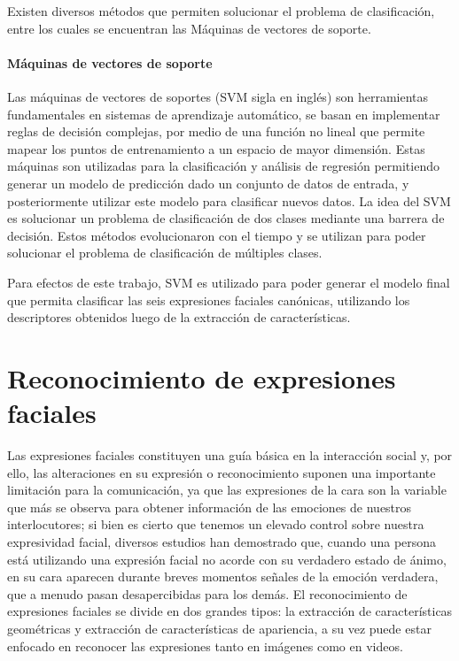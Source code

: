 Existen diversos métodos que permiten solucionar el problema de clasificación, entre los cuales se encuentran las Máquinas de vectores de soporte.

	\paragraph{Máquinas de vectores de soporte}
	\label{sec:svm}
	Las máquinas de vectores de soportes (SVM sigla en inglés) son herramientas fundamentales en sistemas de aprendizaje automático, se basan en  implementar reglas de decisión complejas, por medio de una función no lineal que permite mapear los puntos de entrenamiento a un espacio de mayor dimensión. Estas máquinas son utilizadas para la clasificación y análisis de regresión permitiendo generar un modelo de predicción dado un conjunto de datos de entrada, y posteriormente utilizar este modelo para clasificar nuevos datos.
La idea del SVM es solucionar un problema de clasificación de dos clases mediante una barrera de decisión. Estos métodos evolucionaron con el tiempo y se utilizan para poder solucionar el problema de clasificación de múltiples clases.

Para efectos de este trabajo, SVM es utilizado para poder generar el modelo final que permita clasificar las seis expresiones faciales canónicas, utilizando los descriptores obtenidos luego de la extracción de características.

\section{Reconocimiento de expresiones faciales}
\label{sec:fer}
Las expresiones faciales constituyen una guía básica en la interacción social y, por ello, las alteraciones en su expresión o reconocimiento suponen una importante limitación para la comunicación, ya que las expresiones de la cara son la variable que más se observa para obtener información de las emociones de nuestros interlocutores; si bien es cierto que tenemos un elevado control sobre nuestra expresividad facial, diversos estudios han demostrado que, cuando una persona está utilizando una expresión facial no acorde con su verdadero estado de ánimo, en su cara aparecen durante breves momentos señales de la emoción verdadera, que a menudo pasan desapercibidas para los demás.
El reconocimiento de expresiones faciales se divide en dos grandes tipos: la extracción de características geométricas y extracción de características de apariencia, a su vez puede estar enfocado en reconocer las expresiones tanto en imágenes como en videos.  


